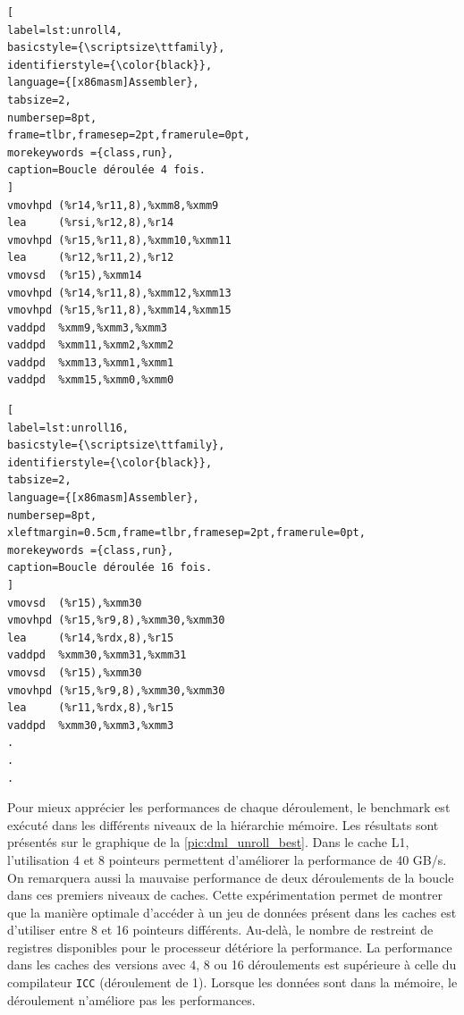 \begin{minipage}{.45\textwidth}
\begin{lstlisting}[
label=lst:unroll4,
basicstyle={\scriptsize\ttfamily},
identifierstyle={\color{black}},
language={[x86masm]Assembler},
tabsize=2,
numbersep=8pt,
frame=tlbr,framesep=2pt,framerule=0pt,
morekeywords ={class,run},
caption=Boucle déroulée 4 fois.
]
vmovhpd (%r14,%r11,8),%xmm8,%xmm9
lea     (%rsi,%r12,8),%r14
vmovhpd (%r15,%r11,8),%xmm10,%xmm11
lea     (%r12,%r11,2),%r12
vmovsd  (%r15),%xmm14
vmovhpd (%r14,%r11,8),%xmm12,%xmm13
vmovhpd (%r15,%r11,8),%xmm14,%xmm15
vaddpd  %xmm9,%xmm3,%xmm3
vaddpd  %xmm11,%xmm2,%xmm2
vaddpd  %xmm13,%xmm1,%xmm1
vaddpd  %xmm15,%xmm0,%xmm0
\end{lstlisting}
\end{minipage}%
\hfill
%
\begin{minipage}{.45\textwidth}
\begin{lstlisting}[
label=lst:unroll16,
basicstyle={\scriptsize\ttfamily},
identifierstyle={\color{black}},
tabsize=2,
language={[x86masm]Assembler},
numbersep=8pt,
xleftmargin=0.5cm,frame=tlbr,framesep=2pt,framerule=0pt,
morekeywords ={class,run},
caption=Boucle déroulée 16 fois.
]
vmovsd  (%r15),%xmm30
vmovhpd (%r15,%r9,8),%xmm30,%xmm30
lea     (%r14,%rdx,8),%r15
vaddpd  %xmm30,%xmm31,%xmm31
vmovsd  (%r15),%xmm30
vmovhpd (%r15,%r9,8),%xmm30,%xmm30
lea     (%r11,%rdx,8),%r15
vaddpd  %xmm30,%xmm3,%xmm3
. 
. 
. 
\end{lstlisting}
\end{minipage}
    
    
    Pour mieux apprécier les performances de chaque déroulement, le benchmark est exécuté dans les différents niveaux de la hiérarchie mémoire. Les résultats sont présentés sur le graphique de la \autoref{pic:dml_unroll_best}. Dans le cache L1, l'utilisation 4 et 8 pointeurs permettent d'améliorer la performance de 40 GB/s. On remarquera aussi la mauvaise performance de deux déroulements de la boucle dans ces premiers niveaux de caches. Cette expérimentation permet de montrer que la manière optimale d'accéder à un jeu de données présent dans les caches est d'utiliser entre 8 et 16 pointeurs différents. Au-delà, le nombre de restreint de registres disponibles pour le processeur détériore la performance. La performance dans les caches des versions avec 4, 8 ou 16 déroulements est supérieure à celle du compilateur \verb|ICC| (déroulement de 1). Lorsque les données sont dans la mémoire, le déroulement n'améliore pas les performances. 

